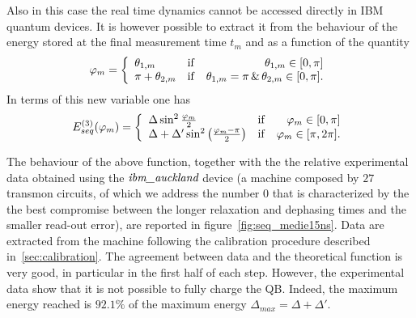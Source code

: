 \documentclass[12pt]{iopart}
\begin{document}
Also in this case the real time dynamics cannot be accessed directly in IBM quantum devices. It is however possible to extract it from the behaviour of the energy stored at the final measurement time $t_{m}$ and  as a function of the quantity 
\begin{equation}
    \varphi_{m}=\left\{\begin{array}{l@{\quad}cr} 
        \theta_{1,m} & \mathrm{if}  & \theta_{1,m}\in[0,\pi]\\
        \pi + \theta_{2,m} & \mathrm{if}  & \theta_{1,m}=\pi \, \& \, \theta_{2,m}\in[0,\pi].
 \end{array}\right.
    \label{eq:energy-two_step}
\end{equation}
In terms of this new variable one has
\begin{equation}
    E^{(3)}_{seq}(\varphi_{m})=\left\{\begin{array}{l@{\quad}cr} 
        \Delta\sin^2\frac{\varphi_{m}}{2} & \mathrm{if}  & \varphi_{m}\in[0,\pi]\\
        \Delta+\Delta'\sin^2\left(\frac{\varphi_{m}-\pi}{2}\right) & \mathrm{if}  & \varphi_{m}\in[\pi,2\pi].
 \end{array}\right.
    \label{eq:energy-two_step}
\end{equation}

The behaviour of the above function, together with the the relative experimental data obtained using the $\emph{ibm\_auckland}$ device (a machine composed by $27$ transmon circuits, of which we address the number $0$ that is characterized by the the best compromise between the longer relaxation and dephasing times and the smaller read-out error), are reported in figure~\ref{fig:seq_medie15ns}. Data are extracted from the machine following the calibration procedure described in~\ref{sec:calibration}. The agreement between data and the theoretical function is very good, in particular in the first half of each step. However, the experimental data show that it is not possible to fully charge the QB. Indeed, the maximum energy reached is $92.1\%$ of the maximum energy $\Delta_{max}=\Delta+\Delta'$.
\end{document}
